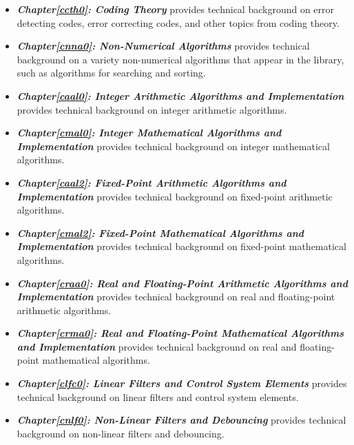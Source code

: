 \begin{itemize}
\item \emph{\textbf{Chapter\postchapterwordnonstretchable{}\ref{ccth0}: 
      Coding Theory}} provides technical background on error detecting codes, 
      error correcting codes, and other topics from coding theory.  
\item \emph{\textbf{Chapter\postchapterwordnonstretchable{}\ref{cnna0}: 
      Non-Numerical Algorithms}} provides technical background on a variety 
      non-numerical algorithms that appear in the library, such as algorithms 
      for searching and sorting.  
\item \emph{\textbf{Chapter\postchapterwordnonstretchable{}\ref{caal0}: 
      Integer Arithmetic Algorithms and Implementation}} provides technical 
      background on integer arithmetic algorithms.  
\item \emph{\textbf{Chapter\postchapterwordnonstretchable{}\ref{cmal0}: 
      Integer Mathematical Algorithms and Implementation}} provides technical 
      background on integer mathematical algorithms.  
\item \emph{\textbf{Chapter\postchapterwordnonstretchable{}\ref{caal2}: 
      Fixed-Point Arithmetic Algorithms and Implementation}} provides technical 
      background on fixed-point arithmetic algorithms.  
\item \emph{\textbf{Chapter\postchapterwordnonstretchable{}\ref{cmal2}: 
      Fixed-Point Mathematical Algorithms and Implementation}} provides 
      technical background on fixed-point mathematical algorithms.  
\item \emph{\textbf{Chapter\postchapterwordnonstretchable{}\ref{craa0}: 
      Real and Floating-Point Arithmetic Algorithms and Implementation}} 
      provides technical background on real and floating-point arithmetic 
      algorithms.  
\item \emph{\textbf{Chapter\postchapterwordnonstretchable{}\ref{crma0}: 
      Real and Floating-Point Mathematical Algorithms and Implementation}} 
      provides technical background on real and floating-point mathematical 
      algorithms.  
\item \emph{\textbf{Chapter\postchapterwordnonstretchable{}\ref{clfc0}: 
      Linear Filters and Control System Elements}} provides technical background 
      on linear filters and control system elements.  
\item \emph{\textbf{Chapter\postchapterwordnonstretchable{}\ref{cnlf0}: 
      Non-Linear Filters and Debouncing}} provides technical background on 
      non-linear filters and debouncing.  

\end{itemize}
